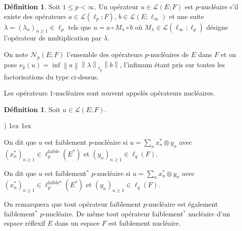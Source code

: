 \documentclass{smfart}
\theoremstyle{plain}
\theoremstyle{definition}
\newtheorem{definition}[theorem]{Définition}
\newcommand {\FAIBLE} {\text{faible}}
\newcommand {\BOUNDED} {{\mathcal L}}
\newcounter{aufzi}
\newenvironment{aufzi}{\begin{list}{ {\upshape\alph{aufzi})}}{
        \usecounter{aufzi}
        \topsep1ex
        \parsep0cm
        \itemsep1ex
        \leftmargin0.8cm
        \labelwidth0.5cm
        \labelsep0.3cm
}}
{\end{list}}
\begin{document}

 \begin{definition}
   Soit $1\leq p < \infty$.  Un opérateur $u \in \BOUNDED(E; F)$ est
   $p$-nucléaire s'il existe des opérateurs
   $a\in\mathcal{L}(\ell_p;F)$, $b\in\mathcal{L}(E; \ell_\infty)$ et
   une suite $\lambda=(\lambda_n)_{n\ge 1}\in\ell_p$ tels que
   $u=a\circ M_{\lambda}\circ b$ où $M_{\lambda} \in
   \BOUNDED(\ell_\infty; \ell_p)$ désigne l'opérateur de
   multiplication par $\lambda$.

   \noindent On note $\mathcal{N}_p\left(E;F\right)$ l'ensemble des
   opérateurs $p$-nucléaires de $E$ dans $F$ et on pose
   $\nu_p\left(u\right)=\inf\left\|a\right\|\left\|\lambda\right\|_{\ell_p}\left\|b\right\|$,
   l'infimum étant pris sur toutes les factorisations du type
   ci-dessus.
\end{definition}

\noindent Les opérateurs $1$-nucléaires sont souvent appelés 
opérateurs nucléaires.

\begin{definition}
Soit $u\in\mathcal{L}\left(E;F\right)$.
\begin{aufzi}
\item On dit que $u$ est faiblement $p$-nucléaire si $u=\sum_n x_n^*{\otimes} y_n$ avec $(x_n^*)_{n\ge
    1}\in\ell_p^\FAIBLE(E^*)$ et $(y_n)_{n\ge 1}\in\ell_q(F)$. 
\item On dit que $u$ est faiblement${}^\ast$ $p$-nucléaire si $u=\sum_n
  x_n^*{\otimes} y_n$ avec $(x_n^*)_{n\ge
    1}\in\ell_p^{\FAIBLE\ast}(E^*)$ et $(y_n)_{n\ge 1}\in\ell_q(F)$.
\end{aufzi}
\end{definition} 

\noindent On remarquera que tout opérateur faiblement $p$-nucléaire est
également faiblement${}^\ast$ $p$-nucléaire. De même tout opérateur
faiblement${}^\ast$ nucléaire d'un espace réflexif $E$ dans un espace $F$
est faiblement nucléaire.
\end{document}
